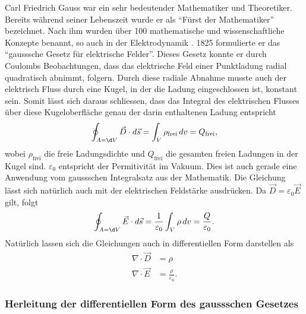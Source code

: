 Carl Friedrich Gauss war ein sehr bedeutender Mathematiker und Theoretiker.
Bereits während seiner Lebenszeit wurde er als ``Fürst der Mathematiker'' bezeichnet.
Nach ihm wurden über 100 mathematische und wissenschaftliche Konzepte benannt, so auch in der Elektrodynamik \cite{maxwell:Carl_Friedrich_Gauß}.
1825 formulierte er das ``gausssche Gesetz für elektrische Felder''.
Dieses Gesetz konnte er durch Coulombs Beobachtungen, dass das elektrische Feld einer Punktladung radial quadratisch abnimmt, folgern.
Durch diese radiale Abnahme musste auch der elektrisch Fluss durch eine Kugel, in der die Ladung eingeschlossen ist, konstant sein.
Somit lässt sich daraus schliessen, dass das Integral des elektrischen Flusses über diese Kugeloberfläche genau der darin enthaltenen Ladung entspricht \cite{maxwell:Gaußscher_Integralsatz}
\[
\oint_{A=\d V} \vec{D} \cdot d\vec{s}
=
\int_{V} \rho_{\text{frei}}\, dv
=
Q_{\text{frei}} ,
\]
wobei $\rho_{\text{frei}}$ die freie Ladungsdichte und $Q_{\text{frei}}$ die gesamten freien Ladungen in der Kugel sind. $\varepsilon_0$ entspricht der Permitivität im Vakuum. Dies ist auch gerade eine Anwendung vom gaussschen Integralsatz aus der Mathematik.
Die Gleichung lässt sich natürlich auch mit der elektrischen Feldstärke ausdrücken. Da $\vec{D} = \varepsilon_0 \vec{E}$ gilt, folgt
\[
\oint_{A=\d V} \vec{E} \cdot d\vec{s}
=
\frac{1}{\varepsilon_0}\int_{V} \rho\, dv
=
\frac{Q}{\varepsilon_0} .
\]
Natürlich lassen sich die Gleichungen auch in differentiellen Form darstellen als
\begin{align*}
	\nabla \cdot \vec{D}
	&=
	\rho
	\\
	\nabla \cdot \vec{E}
	&=
	\frac{\rho}{\varepsilon_0} .
\end{align*}

\subsubsection{Herleitung der differentiellen Form des gaussschen Gesetzes}


